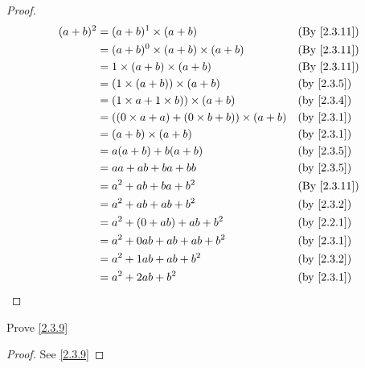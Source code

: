 \begin{proof}
  \begin{align*}
    (a + b)^2 & = (a + b)^1 \times (a + b)                             &  & \text{(By \cref{2.3.11})} \\
              & = (a + b)^0 \times (a + b) \times (a + b)              &  & \text{(By \cref{2.3.11})} \\
              & = 1 \times (a + b) \times (a + b)                      &  & \text{(By \cref{2.3.11})} \\
              & = (1 \times (a + b)) \times (a + b)                    &  & \by{2.3.5}                \\
              & = (1 \times a + 1 \times b)) \times (a + b)            &  & \by{2.3.4}                \\
              & = ((0 \times a + a) + (0 \times b + b)) \times (a + b) &  & \by{2.3.1}                \\
              & = (a + b) \times (a + b)                               &  & \by{2.3.1}                \\
              & = a(a + b) + b(a + b)                                  &  & \by{2.3.5}                \\
              & = aa + ab + ba + bb                                    &  & \by{2.3.5}                \\
              & = a^2 + ab + ba + b^2                                  &  & \text{(By \cref{2.3.11})} \\
              & = a^2 + ab + ab + b^2                                  &  & \by{2.3.2}                \\
              & = a^2 + (0 + ab) + ab + b^2                            &  & \by{2.2.1}                \\
              & = a^2 + 0ab + ab + ab + b^2                            &  & \by{2.3.1}                \\
              & = a^2 + 1ab + ab + b^2                                 &  & \by{2.3.2}                \\
              & = a^2 + 2ab + b^2                                      &  & \by{2.3.1}                \\
  \end{align*}
\end{proof}

\begin{ex}\label{ex:2.3.5}
  Prove \cref{2.3.9}
\end{ex}

\begin{proof}
  See \cref{2.3.9}
\end{proof}